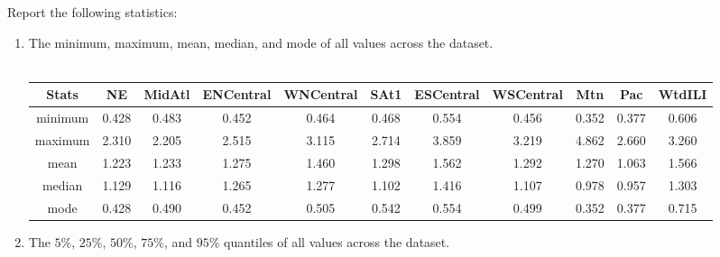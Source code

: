 \documentclass{article}
\def\blu#1{{\color{blu}#1}}
\def\ans#1{{\color{ans}#1}}
\def\enum#1{\begin{enumerate}#1\end{enumerate}}
\begin{document}
\blu{Report the following statistics}:
\enum{
\item The minimum, maximum, mean, median, and mode of all values across the dataset.\\ \\
%
%
\ans{
    \scriptsize
    \setlength{\tabcolsep}{2pt}
    \begin{tabular}{SSSSSSSSSSS} \toprule
        {Stats} & {NE} & {MidAtl} & {ENCentral} & {WNCentral} & {SAt1} & {ESCentral} & {WSCentral} & {Mtn} & {Pac} & {WtdILI} \\ \midrule
        {minimum} & 0.428 & 0.483 & 0.452 & 0.464 & 0.468 & 0.554 & 0.456 & 0.352 & 0.377 & 0.606 \\
        {maximum} & 2.310 & 2.205 & 2.515 & 3.115 & 2.714 & 3.859 & 3.219 & 4.862 & 2.660 & 3.260 \\
        {mean} & 1.223 & 1.233 & 1.275 & 1.460 & 1.298 & 1.562 & 1.292 & 1.270 & 1.063 & 1.566 \\
        {median} & 1.129 & 1.116 & 1.265 & 1.277 & 1.102 & 1.416 & 1.107 & 0.978 & 0.957 & 1.303 \\
        {mode} & 0.428 & 0.490 & 0.452 & 0.505 & 0.542 & 0.554 & 0.499 & 0.352 & 0.377 & 0.715 \\ \bottomrule
    \end{tabular}
    \normalsize
}
\setlength{\tabcolsep}{6pt}
\item The $5\%$, $25\%$, $50\%$, $75\%$, and $95\%$ quantiles of all values across the dataset. \\ \\
\ans{
    \scriptsize
}}
\end{document}
